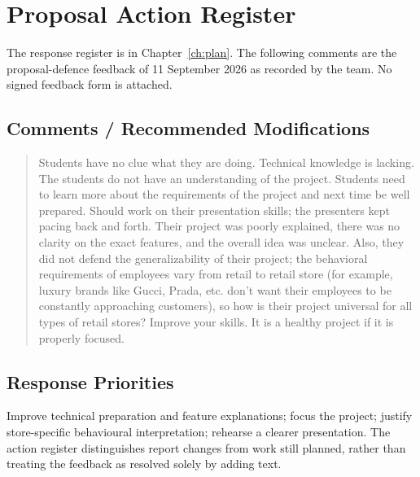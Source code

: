 \chapter{Proposal Action Register}
\label{app:actions}
The response register is in Chapter~\ref{ch:plan}. The following comments are the proposal-defence feedback of 11 September 2026 as recorded by the team. No signed feedback form is attached.
\section{Comments / Recommended Modifications}
\begin{quote}
Students have no clue what they are doing. Technical knowledge is lacking. The students do not have an understanding of the project. Students need to learn more about the requirements of the project and next time be well prepared. Should work on their presentation skills; the presenters kept pacing back and forth. Their project was poorly explained, there was no clarity on the exact features, and the overall idea was unclear. Also, they did not defend the generalizability of their project; the behavioral requirements of employees vary from retail to retail store (for example, luxury brands like Gucci, Prada, etc. don't want their employees to be constantly approaching customers), so how is their project universal for all types of retail stores? Improve your skills. It is a healthy project if it is properly focused.
\end{quote}
\section{Response Priorities}
Improve technical preparation and feature explanations; focus the project; justify store-specific behavioural interpretation; rehearse a clearer presentation. The action register distinguishes report changes from work still planned, rather than treating the feedback as resolved solely by adding text.
